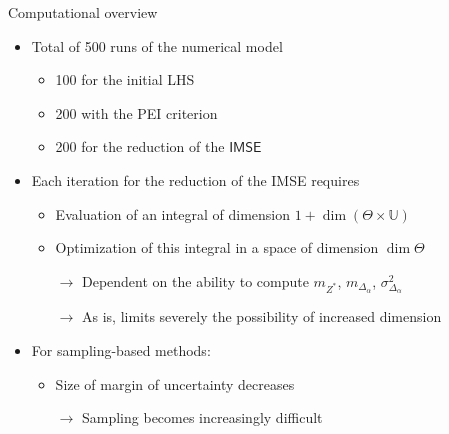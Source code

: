 \documentclass[10pt,aspectratio=169,usepdftitle=false]{beamer}
\newcommand{\Uspace}{\mathbb{U}}
\newcommand{\Kspace}{\Theta}
\newcommand{\Ex}{\mathbb{E}}
\begin{document}
\begin{frame}{Computational overview}
  \begin{itemize}
  \item Total of 500 runs of the numerical model
    \begin{itemize}
    \item 100 for the initial LHS
    \item 200 with the PEI criterion
    \item 200 for the reduction of the $\mathsf{IMSE}$
    \end{itemize}
    
  \item Each iteration for the reduction of the IMSE requires
  \begin{itemize}
  \item Evaluation of an integral of dimension $1 + \dim (\Kspace \times \Uspace)$
  \item Optimization of this integral in a space of dimension $\dim \Kspace$
  \item[$\rightarrow$] Dependent on the ability to compute $m_{Z^*}$, $m_{\Delta_{\alpha}}$, $\sigma^2_{\Delta_{\alpha}}$
   \item[$\rightarrow$] As is, limits severely the possibility of increased dimension
   \end{itemize}
 \item For sampling-based methods:
   \begin{itemize}
   \item Size of margin of uncertainty decreases
   \item[$\rightarrow$] Sampling becomes increasingly difficult
   \end{itemize}
  \end{itemize}
\end{frame}
\end{document}
